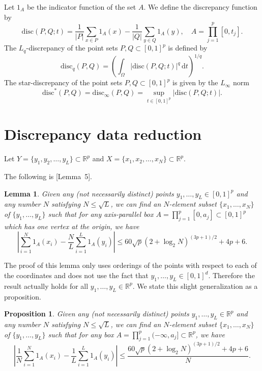 \documentclass[12pt]{article}
\newtheorem{lemma}{Lemma}
\newtheorem{proposition}{Proposition}
\begin{document}
Let $1_A$ be the indicator function of the set $A$. We define the discrepancy function by
\begin{equation*}
\mathrm{disc}(P,Q; t) =  \frac{1}{|P|} \sum_{x \in P} 1_A(x) - \frac{1}{|Q|} \sum_{y \in Q} 1_A(y), \quad A = \prod_{j=1}^p [0, t_j].
\end{equation*}
The $L_q$-discrepancy of the point sets $P, Q \subset [0,1]^p$ is defined by
\begin{equation*}
\mathrm{disc}_q(P,Q) = \left( \int_{\Omega} |\mathrm{disc}(P,Q; t)|^q \,\mathrm{d} t \right)^{1/q}.
\end{equation*}
The star-discrepancy of the point sets $P, Q \subset [0,1]^p$ is given by the $L_\infty$ norm
\begin{equation*}
\mathrm{disc}^\ast(P,Q) = \mathrm{disc}_\infty(P,Q) = \sup_{t \in [0,1]^p} \left| \mathrm{disc}(P,Q; t) \right|.
\end{equation*}

\section{Discrepancy data reduction}

Let $Y = \{y_1, y_2, \ldots, y_L\} \subset \mathbb{R}^p$ and $X = \{x_1, x_2, \ldots, x_N\} \subset \mathbb{R}^p$.

The following is \cite{AD14}[Lemma~5].
\begin{lemma}
Given any (not necessarily distinct) points $y_1, \ldots, y_L \in [0,1]^p$ and any number $N$ satisfying $N \leq \sqrt{L}$, we can find an $N$-element subset $\{x_1, \ldots, x_N\}$ of $\{y_1, \ldots, y_L\}$ such that for any axis-parallel box $A = \prod_{j=1}^p [0, a_j] \subset [0,1]^p$ which has one vertex at the origin, we have
\begin{equation*}
\left| \sum_{i=1}^N 1_A(x_i) -  \frac{N}{L} \sum_{i=1}^L 1_{A}(y_i)  \right| \le 60 \sqrt{p} (2 + \log_2 N)^{(3p+1)/2} + 4p + 6.
\end{equation*}
\end{lemma}

The proof of this lemma only uses orderings of the points with respect to each of the coordinates and does not use the fact that $y_1,\ldots, y_L \in [0,1]^d$. Therefore the result actually holds for all $y_1, \ldots, y_L \in \mathbb{R}^p$. We state this slight generalization as a proposition.

\begin{proposition}
 Given any (not necessarily distinct) points $y_1, \ldots, y_L \in \mathbb{R}^p$ and any number $N$ satisfying $N \leq \sqrt{L}$, we can find an $N$-element subset $\{x_1, \ldots, x_N\}$ of $\{y_1, \ldots, y_L\}$ such that for any box $A = \prod_{j=1}^p (-\infty, a_j] \subset \mathbb{R}^p$, we have
\begin{equation*}
\left| \frac{1}{N} \sum_{i=1}^N 1_A(x_i) -  \frac{1}{L} \sum_{i=1}^L 1_{A}(y_i)  \right| \le \frac{ 60 \sqrt{p} (2 + \log_2 N)^{(3p+1)/2} + 4p + 6 }{N}.
\end{equation*}
\end{proposition}
\end{document}
